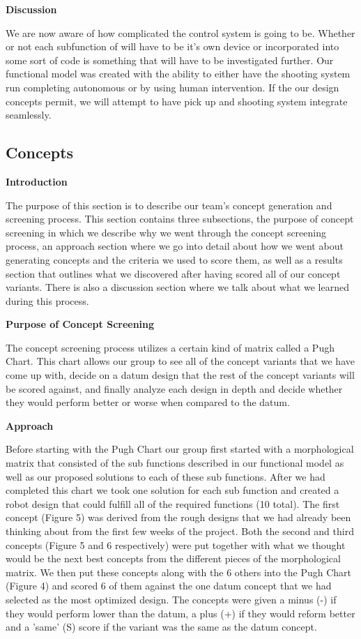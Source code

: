 \documentclass[12pt,letterpaper,titlepage]{article}
\begin{document}
\smallskip\noindent\textbf{Discussion}

We are now aware of how complicated the control system is going to be. Whether or not each subfunction of will have to be it's own device or incorporated into some sort of code is something that will have to be investigated further. Our functional model was created with the ability to either have the shooting system run completing autonomous or by using human intervention. If the our design concepts permit, we will attempt to have pick up and shooting system integrate seamlessly. 

\subsection{Concepts}

\smallskip\noindent\textbf{Introduction}

The purpose of this section is to describe our team's concept generation and screening process. This section contains three subsections, the purpose of concept screening in which we describe why we went through the concept screening process, an approach section where we go into detail about how we went about generating concepts and the criteria we used to score them, as well as a results section that outlines what we discovered after having scored all of our concept variants. There is also a discussion section where we talk about what we learned during this process.

\smallskip\noindent\textbf{Purpose of Concept Screening}

The concept screening process utilizes a certain kind of matrix called a Pugh Chart. This chart allows our group to see all of the concept variants that we have come up with, decide on a datum design that the rest of the concept variants will be scored against, and finally analyze each design in depth and decide whether they would perform better or worse when compared to the datum. 

\smallskip\noindent\textbf{Approach}

Before starting with the Pugh Chart our group first started with a morphological matrix that consisted of the sub functions described in our functional model as well as our proposed solutions to each of these sub functions. After we had completed this chart we took one solution for each sub function and created a robot design that could fulfill all of the required functions (10 total). The first concept (Figure 5) was derived from the rough designs that we had already been thinking about from the first few weeks of the project. Both the second and third concepts (Figure 5 and 6 respectively) were put together with what we thought would be the next best concepts from the different pieces of the morphological matrix. We then put these concepts along with the 6 others into the Pugh Chart (Figure 4) and scored 6 of them against the one datum concept that we had selected as the most optimized design. The concepts were given a minus (-) if they would perform lower than the datum, a plus (+) if they would reform better and a 'same' (S) score if the variant was the same as the datum concept.
\end{document}
